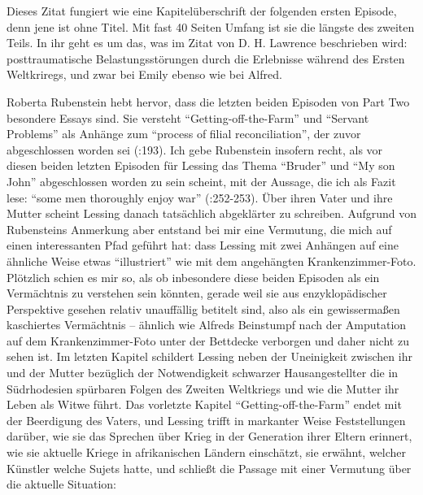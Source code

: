 \documentclass[fontsize=12pt]{scrartcl}
\begin{document}
Dieses Zitat fungiert wie eine Kapitel\"uberschrift der folgenden ersten Episode, denn jene ist ohne Titel. Mit fast 40 Sei\-ten Umfang ist sie die l\"angste des zwei\-ten Teils. In ihr geht es um das, was im Zitat von D. H. Lawrence beschrieben wird: posttraumatische Belastungsst\"orungen durch die Erlebnisse w\"ahrend des Ersten Weltkriregs, und zwar bei Emily ebenso wie bei Alfred. 

Roberta Rubenstein hebt hervor, dass die letzten beiden Episoden von Part Two besondere Essays sind. Sie versteht "`Getting-off-the-Farm"' und "`Servant Pro\-blems"' als Anh\"ange zum "`process of filial reconciliation"', der zuvor abgeschlossen worden sei (\cite{Rubenstein2014}:193). Ich gebe Rubenstein insofern recht, als vor diesen beiden letzten Episoden f\"ur Lessing das Thema "`Bruder"' und "`My son John"' abgeschlossen worden zu sein scheint, mit der Aussage, die ich als Fazit lese: "`some men thoroughly enjoy war"' (\cite{Lessing2008}:252-253). \"Uber ihren Vater und ihre Mutter scheint Lessing danach tats\"achlich abgekl\"arter zu schrei\-ben. Aufgrund von Rubensteins Anmerkung aber entstand bei mir eine Vermutung, die mich auf einen interessanten Pfad gef\"uhrt hat: dass Lessing mit zwei Anh\"angen auf eine \"ahnliche Weise etwas "`illustriert"' wie mit dem angeh\"angten Krankenzimmer-Foto. Pl\"otzlich schien es mir so, als ob inbesondere diese beiden Episoden als ein Verm\"achtnis zu verstehen sein k\"onnten, gerade weil sie aus en\-zy\-klo\-p\"adischer Perspektive gesehen relativ unauff\"allig betitelt sind, also als ein gewisserma{\ss}en kaschiertes Verm\"achtnis -- \"ahnlich wie Alfreds Beinstumpf nach der Amputation auf dem Krankenzimmer-Foto unter der Bettdecke verborgen und daher nicht zu sehen ist. Im letzten Kapitel schildert Lessing neben der Uneinigkeit zwischen ihr und der Mutter bez\"uglich der Notwendigkeit schwarzer Hausangestellter die in S\"udrhodesien sp\"urbaren Folgen des Zwei\-ten Weltkriegs und wie die Mutter ihr Leben als Witwe f\"uhrt. Das vorletzte Kapitel "`Getting-off-the-Farm"' endet mit der Beerdigung des Vaters, und Lessing trifft in markanter Weise Feststellungen dar\"uber, wie sie das Sprechen \"uber Krieg in der Generation ihrer Eltern erinnert, wie sie aktuelle Kriege in afrikanischen L\"andern einsch\"atzt, sie erw\"ahnt, welcher K\"unstler welche Sujets hatte, und schlie{\ss}t die Passage mit einer Vermutung \"uber die aktuelle Situation:
\end{document}
